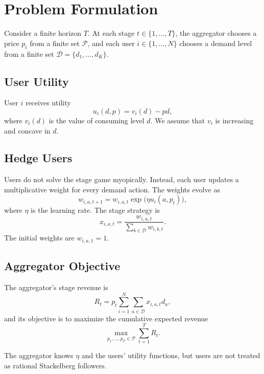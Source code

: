 \documentclass[conference]{IEEEtran}
\begin{document}
\section{Problem Formulation}
Consider a finite horizon $T$. At each stage $t \in \{1,\dots,T\}$, the aggregator chooses a price $p_t$ from a finite set $\mathcal{P}$, and each user $i \in \{1,\dots,N\}$ chooses a demand level from a finite set $\mathcal{D} = \{d_1, \dots, d_K\}$.

\subsection{User Utility}
User $i$ receives utility
\begin{equation}
    u_i(d, p) = v_i(d) - p d,
\end{equation}
where $v_i(d)$ is the value of consuming level $d$. We assume that $v_i$ is increasing and concave in $d$.

\subsection{Hedge Users}
Users do not solve the stage game myopically. Instead, each user updates a multiplicative weight for every demand action. The weights evolve as
\begin{equation}
    w_{i,a,t+1} = w_{i,a,t} \exp\bigl(\eta u_i(a, p_t)\bigr),
\end{equation}
where $\eta$ is the learning rate. The stage strategy is
\begin{equation}
    x_{i,a,t} = \frac{w_{i,a,t}}{\sum_{b \in \mathcal{D}} w_{i,b,t}}.
\end{equation}
The initial weights are $w_{i,a,1} = 1$.

\subsection{Aggregator Objective}
The aggregator's stage revenue is
\begin{equation}
    R_t = p_t \sum_{i=1}^{N} \sum_{a \in \mathcal{D}} x_{i,a,t} d_a,
\end{equation}
and its objective is to maximize the cumulative expected revenue
\begin{equation}
    \max_{p_1,\dots,p_T \in \mathcal{P}} \sum_{t=1}^{T} R_t.
\end{equation}

The aggregator knows $\eta$ and the users' utility functions, but users are not treated as rational Stackelberg followers.
\end{document}
